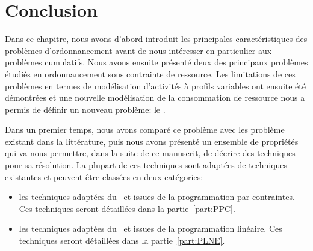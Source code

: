 
\section{Conclusion}

Dans ce chapitre, nous avons d'abord introduit les principales
caractéristiques des problèmes d'ordonnancement avant de nous intéresser
en particulier aux problèmes cumulatifs. Nous avons ensuite présenté
deux des principaux problèmes étudiés en ordonnancement sous
contrainte de ressource. Les limitations de ces problèmes en termes de
modélisation d'activités à profils variables ont ensuite
été démontrées et une nouvelle modélisation de la consommation de
ressource nous a permis de définir un nouveau problème: le
\CECSP. 

Dans un premier temps, nous avons comparé ce problème avec les
problème existant dans la littérature, puis nous avons présenté un
ensemble de propriétés qui va nous permettre, dans la suite de ce
manuscrit, de décrire des techniques pour sa résolution. La plupart de
ces techniques sont adaptées de techniques existantes et peuvent être
classées en deux catégories: 
\begin{itemize}
\item les techniques adaptées du \CUSP~et issues de la programmation
par contraintes. Ces techniques seront détaillées dans la
partie~\ref{part:PPC}.
\item les techniques adaptées du \RCPSP~et issues de la programmation
linéaire. Ces techniques seront détaillées dans la
partie~\ref{part:PLNE}.
\end{itemize}